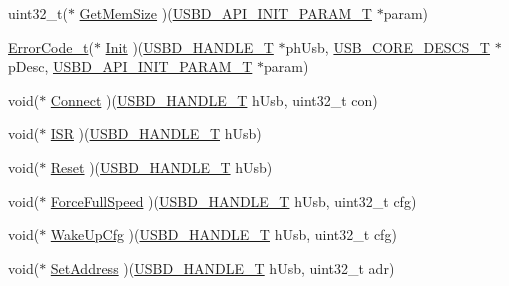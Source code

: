 \begin{DoxyCompactItemize}
\item 
uint32\+\_\+t($\ast$ \hyperlink{struct_u_s_b_d___h_w___a_p_i_a59a65bd037723d735b684c308d99fc54}{Get\+Mem\+Size} )(\hyperlink{group___u_s_b_d___core_gaa6e8171941c1ae63afed95974e0f18e3}{U\+S\+B\+D\+\_\+\+A\+P\+I\+\_\+\+I\+N\+I\+T\+\_\+\+P\+A\+R\+A\+M\+\_\+T} $\ast$param)
\item 
\hyperlink{error_8h_a905255056c349318139d94aa4523d516}{Error\+Code\+\_\+t}($\ast$ \hyperlink{struct_u_s_b_d___h_w___a_p_i_adfa3d0348994e49354243951f2ac95c9}{Init} )(\hyperlink{group___u_s_b_d___core_gafdbb2204d929cb9d75736bd2b42342ac}{U\+S\+B\+D\+\_\+\+H\+A\+N\+D\+L\+E\+\_\+T} $\ast$ph\+Usb, \hyperlink{group___u_s_b_d___core_gabdc617d119eac0555f91bea957c41ecc}{U\+S\+B\+\_\+\+C\+O\+R\+E\+\_\+\+D\+E\+S\+C\+S\+\_\+T} $\ast$p\+Desc, \hyperlink{group___u_s_b_d___core_gaa6e8171941c1ae63afed95974e0f18e3}{U\+S\+B\+D\+\_\+\+A\+P\+I\+\_\+\+I\+N\+I\+T\+\_\+\+P\+A\+R\+A\+M\+\_\+T} $\ast$param)
\item 
void($\ast$ \hyperlink{struct_u_s_b_d___h_w___a_p_i_a0aa79cfec1d36414f1cbc3268b96cb19}{Connect} )(\hyperlink{group___u_s_b_d___core_gafdbb2204d929cb9d75736bd2b42342ac}{U\+S\+B\+D\+\_\+\+H\+A\+N\+D\+L\+E\+\_\+T} h\+Usb, uint32\+\_\+t con)
\item 
void($\ast$ \hyperlink{struct_u_s_b_d___h_w___a_p_i_a692e7cd9ee17c66281daad517ab5636d}{I\+SR} )(\hyperlink{group___u_s_b_d___core_gafdbb2204d929cb9d75736bd2b42342ac}{U\+S\+B\+D\+\_\+\+H\+A\+N\+D\+L\+E\+\_\+T} h\+Usb)
\item 
void($\ast$ \hyperlink{struct_u_s_b_d___h_w___a_p_i_a1d4278c750d621f59f3b25c28c46c263}{Reset} )(\hyperlink{group___u_s_b_d___core_gafdbb2204d929cb9d75736bd2b42342ac}{U\+S\+B\+D\+\_\+\+H\+A\+N\+D\+L\+E\+\_\+T} h\+Usb)
\item 
void($\ast$ \hyperlink{struct_u_s_b_d___h_w___a_p_i_ac4a7b25e6c9ccede46fc9b8185325e39}{Force\+Full\+Speed} )(\hyperlink{group___u_s_b_d___core_gafdbb2204d929cb9d75736bd2b42342ac}{U\+S\+B\+D\+\_\+\+H\+A\+N\+D\+L\+E\+\_\+T} h\+Usb, uint32\+\_\+t cfg)
\item 
void($\ast$ \hyperlink{struct_u_s_b_d___h_w___a_p_i_a9b6402065d4944bbd58235202fbd979f}{Wake\+Up\+Cfg} )(\hyperlink{group___u_s_b_d___core_gafdbb2204d929cb9d75736bd2b42342ac}{U\+S\+B\+D\+\_\+\+H\+A\+N\+D\+L\+E\+\_\+T} h\+Usb, uint32\+\_\+t cfg)
\item 
void($\ast$ \hyperlink{struct_u_s_b_d___h_w___a_p_i_a6ebb5432603102039aade6822b082c8f}{Set\+Address} )(\hyperlink{group___u_s_b_d___core_gafdbb2204d929cb9d75736bd2b42342ac}{U\+S\+B\+D\+\_\+\+H\+A\+N\+D\+L\+E\+\_\+T} h\+Usb, uint32\+\_\+t adr)

\end{DoxyCompactItemize}
